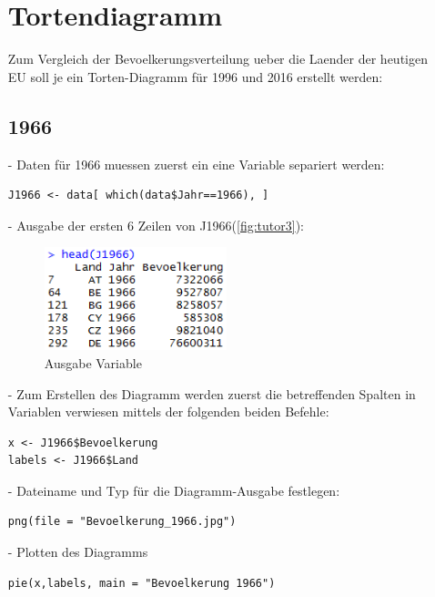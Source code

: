 \begin{itemize}
\section*{Tortendiagramm}
Zum Vergleich der Bevoelkerungsverteilung ueber die Laender der heutigen EU soll je ein Torten-Diagramm für 1996 und 2016 erstellt werden:

\subsection*{1966}
\item[-]Daten für 1966 muessen zuerst ein eine Variable separiert werden:
\begin{lstlisting}
J1966 <- data[ which(data$Jahr==1966), ]
\end{lstlisting}
\item[-]Ausgabe der ersten 6 Zeilen von J1966(\autoref{fig:tutor3}):
\begin{figure}[!htb]
        \begin{minipage}{1\textwidth}
                \centering
                \includegraphics[width=0.50\textwidth]{pics/tutor3.png}\par\vspace{0cm}
                \caption{Ausgabe Variable}
                \label{fig:tutor3}
        \end{minipage}
\end{figure}

\item[-]Zum Erstellen des Diagramm werden zuerst die betreffenden Spalten in Variablen verwiesen mittels der folgenden beiden Befehle:
\begin{lstlisting}
x <- J1966$Bevoelkerung
labels <- J1966$Land
\end{lstlisting}
\item[-]Dateiname und Typ für die Diagramm-Ausgabe festlegen:
\begin{lstlisting}
png(file = "Bevoelkerung_1966.jpg")
\end{lstlisting}
			
\item[-]Plotten des Diagramms
\begin{lstlisting}
pie(x,labels, main = "Bevoelkerung 1966")
\end{lstlisting}


\end{itemize}
